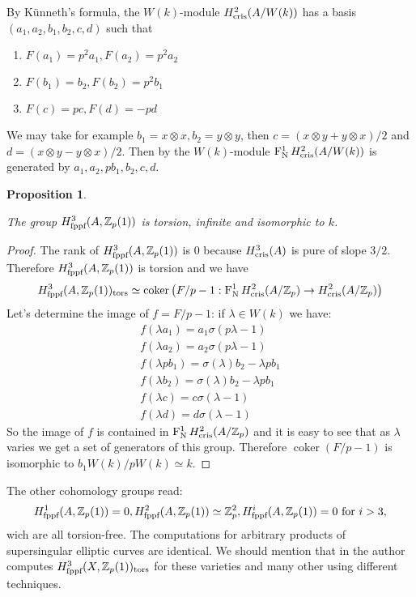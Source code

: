 \documentclass[11pt]{article}
\theoremstyle{plain}
\newtheorem{Prop}[Thm]{Proposition}
\theoremstyle{definition}
\theoremstyle{remark}
\numberwithin{equation}{section}
\newenvironment{propos}[1]%
    { \begin{Prop} \label{P:#1}}%
    { \end{Prop} }
\newcommand{\prop}[1]{\begin{propos}{#1}\sl }
\newcommand{\eprop}{\end{propos}}
\newcommand{\prf}{ \begin{proof} }
\newcommand{\epr}{ \end{proof} }
\newcommand{\Zp}{\mathbb{Z}_p}
\DeclareMathOperator{\coker}{coker}
\newcommand{\W}{W}                                                       %
\newcommand\Hflat[1]{H^{#1}_{\textnormal{fppf}}}                         %
\DeclareMathOperator{\Nyg}{F_N^1}                                      %
\newcommand\Hcris[1]{H^{#1}_{\textnormal{cris}}}                         %
\begin{document}
By Künneth's formula, the $\W(k)$-module $\Hcris{2}(A/\W(k))$ has a basis $(a_1,a_2,b_1,b_2,c,d)$ such that
\begin{enumerate}
    \item $F(a_1)=p^2a_1,F(a_2)=p^2a_2$
    \item $F(b_1)=b_2,F(b_2)=p^2b_1$
    \item $F(c)=pc,F(d)=-pd$
\end{enumerate}
We may take for example $b_1=x\otimes x,b_2=y\otimes y$, then $c=(x\otimes y+y\otimes x)/2$ and $d=(x\otimes y-y\otimes x)/2$. Then by  the $\W(k)$-module $\Nyg\Hcris{2}(A/\W(k))$ is generated by $a_1,a_2,pb_1,b_2,c,d$.

\prop{gruppoinifinito}

The group $\Hflat{3}(A,\Zp(1))$ is torsion, infinite and isomorphic to $k$.

\eprop

\prf

The rank of $\Hflat{3}(A,\Zp(1))$ is $0$ because $\Hcris{3}(A)$ is pure of slope $3/2$. Therefore $\Hflat{3}(A,\Zp(1))$ is torsion and we have
\[
\Hflat{3}(A,\Zp(1))_{\text{tors}}\simeq\coker\left(F/p-1:\Nyg\Hcris{2}(A/\Zp)\to\Hcris{2}(A/\Zp)\right)
\]
Let's determine the image of $f=F/p-1$: if $\lambda\in\W(k)$ we have:
\begin{align*}
f(\lambda a_1)=a_1\sigma(p\lambda-1)\\
f(\lambda a_2)=a_2\sigma(p\lambda-1)\\
f(\lambda pb_1)=\sigma(\lambda)b_2-\lambda pb_1\\
f(\lambda b_2)=\sigma(\lambda)b_2-\lambda pb_1\\
f(\lambda c)=c\sigma(\lambda-1)\\
f(\lambda d)=d\sigma(\lambda-1)
\end{align*}
So the image of $f$ is contained in $\Nyg\Hcris{2}(A/\Zp)$ and it is easy to see that as $\lambda$ varies we get a set of generators of this group. Therefore $\coker\left(F/p-1\right)$ is isomorphic to $b_1\W(k)/p\W(k)\simeq k$.
\epr
The other cohomology groups read: 
\[
\Hflat{1}(A,\Zp(1))=0, \Hflat{2}(A,\Zp(1))\simeq \Zp^2, \Hflat{i}(A,\Zp(1))=0\text{ for }i>3,
\]
wich are all torsion-free. The computations for arbitrary products of supersingular elliptic curves are identical. We should mention that in \cite{yuanbrauer} the author computes $\Hflat{3}(X,\Zp(1))_{\text{tors}}$ for these varieties and many other using different techniques.
\end{document}
